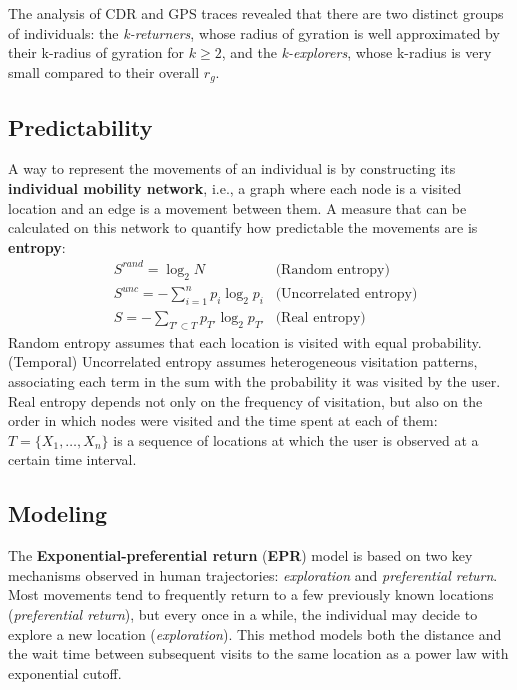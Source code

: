 The analysis of CDR and GPS traces revealed that there are two distinct groups of individuals: the \textit{k-returners}, whose radius of gyration is well approximated by their k-radius of gyration for $k \geq 2$, and the \textit{k-explorers}, whose k-radius is very small compared to their overall $r_g$.

\subsection{Predictability}
A way to represent the movements of an individual is by constructing its \textbf{individual mobility network}, i.e., a graph where each node is a visited location and an edge is a movement between them. A measure that can be calculated on this network to quantify how predictable the movements are is \textbf{entropy}:
\begin{align*}
    &S^{\textit{rand}} = \log_2 N &\text{(Random entropy)} \\
    &S^{\textit{unc}} = - \sum_{i=1}^n p_i \log_2 p_i &\text{(Uncorrelated entropy)} \\
    &S = -\sum_{T' \subset T} p_{T'} \log_2 p_{T'} &\text{(Real entropy)}
\end{align*}
Random entropy assumes that each location is visited with equal probability. (Temporal) Uncorrelated entropy assumes heterogeneous visitation patterns, associating each term in the sum with the probability it was visited by the user. Real entropy depends not only on the frequency of visitation, but also on the order in which nodes were visited and the time spent at each of them: $T = \{X_1, \dots, X_n\}$ is a sequence of locations at which the user is observed at a certain time interval.

\subsection{Modeling}

The \textbf{Exponential-preferential return} (\textbf{EPR}) model is based on two key mechanisms observed in human trajectories: \textit{exploration} and \textit{preferential return}. Most movements tend to frequently return to a few previously known locations (\textit{preferential return}), but every once in a while, the individual may decide to explore a new location (\textit{exploration}). This method models both the distance and the wait time between subsequent visits to the same location as a power law with exponential cutoff.

